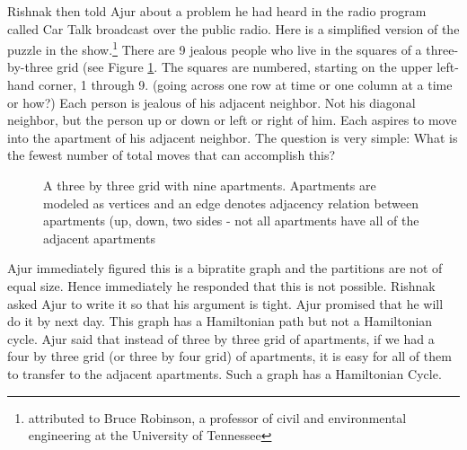 Rishnak then told Ajur about a problem he had heard in the radio program called Car Talk broadcast over the public radio. Here is a simplified version of the puzzle in the show.\footnote{ attributed to Bruce Robinson, a professor of civil and environmental engineering at the University of Tennessee} There are 9 jealous people who live in the squares of a three-by-three grid (see Figure \ref{5g7}. The squares are numbered, starting on the upper left-hand corner, 1 through 9. (going across one row at time or one column at a time or how?) Each person is jealous of his adjacent neighbor. Not his diagonal neighbor, but the person up or down or left or right of him. Each aspires to move into the apartment of his adjacent neighbor.
The question is very simple: What is the fewest number of total moves that can accomplish this?
\begin{figure}
\begin{center}
\caption{ A three by three grid with nine apartments. Apartments are modeled as vertices and an edge denotes adjacency relation between apartments (up, down, two sides - not all apartments have all of the adjacent apartments} \label{5g7}
\end{center}
\end{figure}

Ajur immediately figured  this is a bipratite graph and the partitions are not of equal size. Hence immediately he responded that this is not possible. Rishnak asked Ajur to write it so that his argument is tight. Ajur promised that he will do it by next day. This graph has a Hamiltonian path but not a Hamiltonian cycle. Ajur said that instead of three by three grid of apartments, if we had a four by three grid (or three by four grid) of apartments, it is easy for all of them to transfer to the adjacent apartments. Such a graph has a Hamiltonian Cycle.

